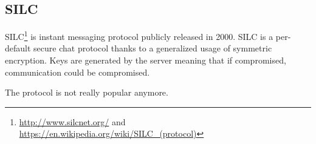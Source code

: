 \subsection{SILC}

SILC\footnote{\url{http://www.silcnet.org/} and
\url{https://en.wikipedia.org/wiki/SILC_(protocol)}} is instant messaging
protocol publicly released in 2000. SILC is a per-default secure chat protocol
thanks to a generalized usage of symmetric encryption. Keys are generated by
the server meaning that if compromised, communication could be compromised.

The protocol is not really popular anymore.




